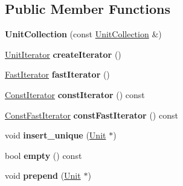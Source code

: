 \subsection*{Public Member Functions}
\begin{DoxyCompactItemize}
\item 
{\bfseries Unit\+Collection} (const \hyperlink{classUnitCollection}{Unit\+Collection} \&)\hypertarget{classUnitCollection_a618a5094c2322cb56fabae14a3c36eca}{}\label{classUnitCollection_a618a5094c2322cb56fabae14a3c36eca}

\item 
\hyperlink{classUnitCollection_1_1UnitIterator}{Unit\+Iterator} {\bfseries create\+Iterator} ()\hypertarget{classUnitCollection_a320e52fbcf60336052930596207e5c90}{}\label{classUnitCollection_a320e52fbcf60336052930596207e5c90}

\item 
\hyperlink{classUnitCollection_1_1FastIterator}{Fast\+Iterator} {\bfseries fast\+Iterator} ()\hypertarget{classUnitCollection_a9328bb6369ccccfc70a16e9843a24449}{}\label{classUnitCollection_a9328bb6369ccccfc70a16e9843a24449}

\item 
\hyperlink{classUnitCollection_1_1ConstIterator}{Const\+Iterator} {\bfseries const\+Iterator} () const \hypertarget{classUnitCollection_a5cb59b46ac8b3c2a69c1469215873066}{}\label{classUnitCollection_a5cb59b46ac8b3c2a69c1469215873066}

\item 
\hyperlink{classUnitCollection_1_1ConstFastIterator}{Const\+Fast\+Iterator} {\bfseries const\+Fast\+Iterator} () const \hypertarget{classUnitCollection_ae98bf27ff05671a04f16e2bb57f57d4a}{}\label{classUnitCollection_ae98bf27ff05671a04f16e2bb57f57d4a}

\item 
void {\bfseries insert\+\_\+unique} (\hyperlink{classUnit}{Unit} $\ast$)\hypertarget{classUnitCollection_a944cf7ab1f0c6b17c2118280e83ea23b}{}\label{classUnitCollection_a944cf7ab1f0c6b17c2118280e83ea23b}

\item 
bool {\bfseries empty} () const \hypertarget{classUnitCollection_ab58bf5136834bd486181b69b5ebca6d5}{}\label{classUnitCollection_ab58bf5136834bd486181b69b5ebca6d5}

\item 
void {\bfseries prepend} (\hyperlink{classUnit}{Unit} $\ast$)\hypertarget{classUnitCollection_acf06d99f3a84453379d2177e3bf8da8d}{}\label{classUnitCollection_acf06d99f3a84453379d2177e3bf8da8d}


\end{DoxyCompactItemize}
